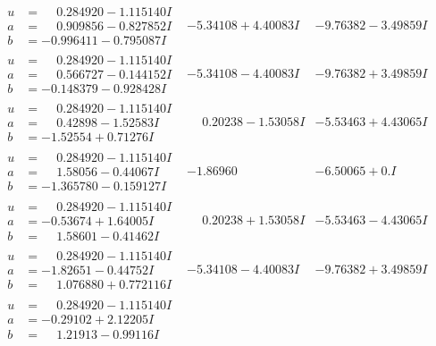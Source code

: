 \documentclass[1p]{elsarticle_modified}
\theoremstyle{definition}
\begin{document}
$$\begin{array}{c|c|c}
\begin{aligned}
u &= \phantom{-}0.284920 - 1.115140 I \\
a &= \phantom{-}0.909856 - 0.827852 I \\
b &= -0.996411 - 0.795087 I\end{aligned}
 & -5.34108 + 4.40083 I & -9.76382 - 3.49859 I \\ \hline\begin{aligned}
u &= \phantom{-}0.284920 - 1.115140 I \\
a &= \phantom{-}0.566727 - 0.144152 I \\
b &= -0.148379 - 0.928428 I\end{aligned}
 & -5.34108 - 4.40083 I & -9.76382 + 3.49859 I \\ \hline\begin{aligned}
u &= \phantom{-}0.284920 - 1.115140 I \\
a &= \phantom{-}0.42898 - 1.52583 I \\
b &= -1.52554 + 0.71276 I\end{aligned}
 & \phantom{-}0.20238 - 1.53058 I & -5.53463 + 4.43065 I \\ \hline\begin{aligned}
u &= \phantom{-}0.284920 - 1.115140 I \\
a &= \phantom{-}1.58056 - 0.44067 I \\
b &= -1.365780 - 0.159127 I\end{aligned}
 & -1.86960\phantom{ +0.000000I} & -6.50065 + 0. I\phantom{ +0.000000I} \\ \hline\begin{aligned}
u &= \phantom{-}0.284920 - 1.115140 I \\
a &= -0.53674 + 1.64005 I \\
b &= \phantom{-}1.58601 - 0.41462 I\end{aligned}
 & \phantom{-}0.20238 + 1.53058 I & -5.53463 - 4.43065 I \\ \hline\begin{aligned}
u &= \phantom{-}0.284920 - 1.115140 I \\
a &= -1.82651 - 0.44752 I \\
b &= \phantom{-}1.076880 + 0.772116 I\end{aligned}
 & -5.34108 - 4.40083 I & -9.76382 + 3.49859 I \\ \hline\begin{aligned}
u &= \phantom{-}0.284920 - 1.115140 I \\
a &= -0.29102 + 2.12205 I \\
b &= \phantom{-}1.21913 - 0.99116 I\end{aligned}

\end{array}$$
\end{document}
